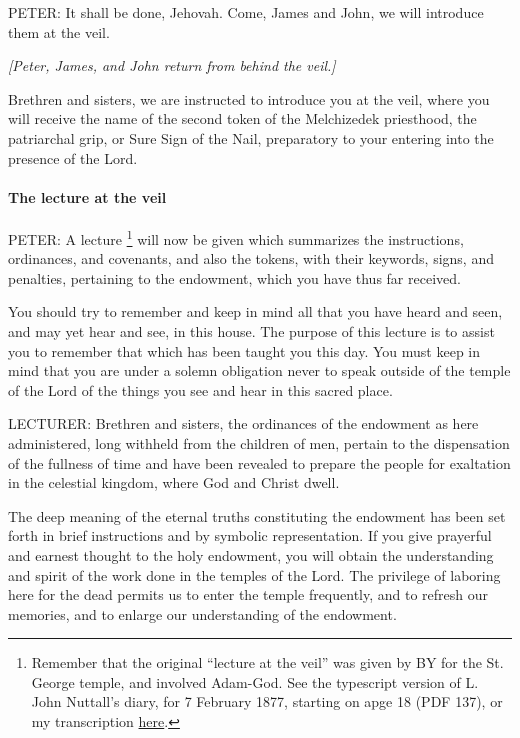 			PETER: It shall be done, Jehovah. Come, James and John, we will introduce them at the veil.

			\textit{[Peter, James, and John return from behind the veil.]}

			Brethren and sisters, we are instructed to introduce you at the veil, where you will receive the name of the second token of the Melchizedek priesthood, the patriarchal grip, or Sure Sign of the Nail, preparatory to your entering into the presence of the Lord.
			
			\paragraph{The lecture at the veil} %
				\label{TEMPLE-ENDOWMENT-ENDOW-PRE-1990-LECTURE}
				
				PETER: A lecture%
					\footnote{%
						\label{ENDOWMENT-lecture}%
						Remember that the original ``lecture at the veil'' was given by BY for the St. George temple, and involved Adam-God. See the typescript version of L. John Nuttall's diary, for 7 February 1877, starting on apge 18 (PDF 137), or my transcription \hyperref[EMS-1877-BY-7-FEB-1877]{here}.
						}
				will now be given which summarizes the instructions, ordinances, and covenants, and also the tokens, with their keywords, signs, and penalties, pertaining to the endowment, which you have thus far received.

				You should try to remember and keep in mind all that you have heard and seen, and may yet hear and see, in this house. The purpose of this lecture is to assist you to remember that which has been taught you this day. You must keep in mind that you are under a solemn obligation never to speak outside of the temple of the Lord of the things you see and hear in this sacred place.

				LECTURER: Brethren and sisters, the ordinances of the endowment as here administered, long withheld from the children of men, pertain to the dispensation of the fullness of time and have been revealed to prepare the people for exaltation in the celestial kingdom, where God and Christ dwell.

				The deep meaning of the eternal truths constituting the endowment has been set forth in brief instructions and by symbolic representation. If you give prayerful and earnest thought to the holy endowment, you will obtain the understanding and spirit of the work done in the temples of the Lord. The privilege of laboring here for the dead permits us to enter the temple frequently, and to refresh our memories, and to enlarge our understanding of the endowment.

